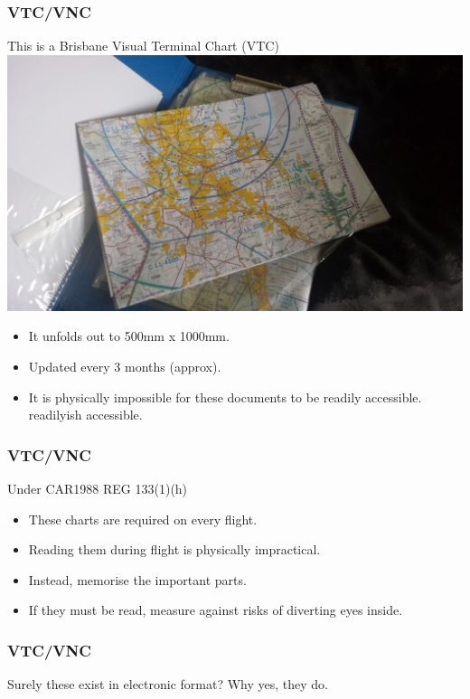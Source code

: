 \begin{frame}
\frametitle{VTC/VNC}
\begin{block}{This is a Brisbane Visual Terminal Chart (VTC)}
\includegraphics[height=0.3\textheight]{image/vtc.png}
\begin{itemize}
\item<1-> It unfolds out to 500mm x 1000mm.
\item<2-> Updated every 3 months (approx).
\item<3-> It is physically impossible for these documents to be readily accessible. \tiny{readilyish accessible.}
\end{itemize}
\end{block}
\end{frame}

\begin{frame}
\frametitle{VTC/VNC}
\begin{block}{Under CAR1988 REG 133(1)(h)}
\begin{itemize}
\item<1-> These charts are required on every flight.
\item<2-> Reading them during flight is physically impractical.
\item<3-> Instead, memorise the important parts.
\item<4-> If they must be read, measure against risks of diverting eyes inside.
\end{itemize}
\end{block}
\end{frame}

\begin{frame}
\frametitle{VTC/VNC}
\begin{block}{Surely these exist in electronic format?}
Why yes, they do.
\end{block}
\end{frame}

